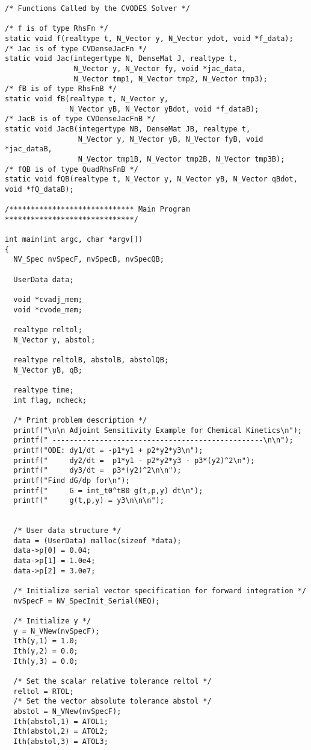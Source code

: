 \begin{verbatim}
/* Functions Called by the CVODES Solver */

/* f is of type RhsFn */
static void f(realtype t, N_Vector y, N_Vector ydot, void *f_data);
/* Jac is of type CVDenseJacFn */
static void Jac(integertype N, DenseMat J, realtype t,
                N_Vector y, N_Vector fy, void *jac_data, 
                N_Vector tmp1, N_Vector tmp2, N_Vector tmp3);
/* fB is of type RhsFnB */
static void fB(realtype t, N_Vector y, 
               N_Vector yB, N_Vector yBdot, void *f_dataB);
/* JacB is of type CVDenseJacFnB */
static void JacB(integertype NB, DenseMat JB, realtype t,
                 N_Vector y, N_Vector yB, N_Vector fyB, void *jac_dataB,
                 N_Vector tmp1B, N_Vector tmp2B, N_Vector tmp3B);
/* fQB is of type QuadRhsFnB */
static void fQB(realtype t, N_Vector y, N_Vector yB, N_Vector qBdot, void *fQ_dataB);

/***************************** Main Program ******************************/

int main(int argc, char *argv[])
{
  NV_Spec nvSpecF, nvSpecB, nvSpecQB;

  UserData data;

  void *cvadj_mem;
  void *cvode_mem;

  realtype reltol;
  N_Vector y, abstol;

  realtype reltolB, abstolB, abstolQB;
  N_Vector yB, qB;

  realtype time;
  int flag, ncheck;

  /* Print problem description */
  printf("\n\n Adjoint Sensitivity Example for Chemical Kinetics\n");
  printf(" -------------------------------------------------\n\n");
  printf("ODE: dy1/dt = -p1*y1 + p2*y2*y3\n");
  printf("     dy2/dt =  p1*y1 - p2*y2*y3 - p3*(y2)^2\n");
  printf("     dy3/dt =  p3*(y2)^2\n\n");
  printf("Find dG/dp for\n");
  printf("     G = int_t0^tB0 g(t,p,y) dt\n");
  printf("     g(t,p,y) = y3\n\n\n");


  /* User data structure */
  data = (UserData) malloc(sizeof *data);
  data->p[0] = 0.04;
  data->p[1] = 1.0e4;
  data->p[2] = 3.0e7;

  /* Initialize serial vector specification for forward integration */
  nvSpecF = NV_SpecInit_Serial(NEQ);

  /* Initialize y */
  y = N_VNew(nvSpecF); 
  Ith(y,1) = 1.0;                
  Ith(y,2) = 0.0;
  Ith(y,3) = 0.0;

  /* Set the scalar relative tolerance reltol */
  reltol = RTOL;               
  /* Set the vector absolute tolerance abstol */
  abstol = N_VNew(nvSpecF); 
  Ith(abstol,1) = ATOL1;       
  Ith(abstol,2) = ATOL2;
  Ith(abstol,3) = ATOL3;


\end{verbatim}
